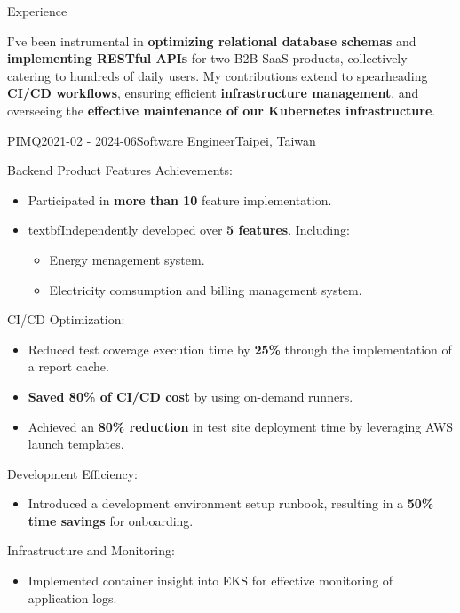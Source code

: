 \documentclass[
	11pt, %
]{resume} %
\newenvironment{myitemize}
  {\begin{itemize}
    \setlength{\itemsep}{-0.5em} \vspace{-0.5em}
  } %
  {\end{itemize}}
\begin{document}
\begin{rSection}{Experience}

  I’ve been instrumental in \textbf{optimizing relational database schemas} and \textbf{implementing RESTful APIs} for two B2B SaaS products, collectively catering to hundreds of daily users.
  My contributions extend to spearheading \textbf{CI/CD workflows}, ensuring efficient \textbf{infrastructure management}, and overseeing the \textbf{effective maintenance of our Kubernetes infrastructure}.

	\begin{rSubsection}{PIMQ}{2021-02 - 2024-06}{Software Engineer}{Taipei, Taiwan}
    \item Backend Product Features Achievements:
    \begin{myitemize}
      \item Participated in \textbf{more than 10} feature implementation. 
      \item textbf{Independently} developed over \textbf{5 features}. Including:
      \begin{myitemize}
        \item Energy menagement system.
        \item Electricity comsumption and billing management system.
      \end{myitemize}
    \end{myitemize}
    \item CI/CD Optimization:
    \begin{myitemize}
      \item Reduced test coverage execution time by \textbf{25\%} through the implementation of a report cache.
      \item \textbf{Saved 80\% of CI/CD cost} by using on-demand runners.
      \item Achieved an \textbf{80\% reduction} in test site deployment time by leveraging AWS launch templates.
    \end{myitemize}
    \item Development Efficiency:
    \begin{myitemize}
      \item Introduced a development environment setup runbook, resulting in a \textbf{50\% time savings} for onboarding.
    \end{myitemize}
    \item Infrastructure and Monitoring:
    \begin{myitemize}
      \item Implemented container insight into EKS for effective monitoring of application logs.

\end{myitemize}
\end{rSubsection}
\end{rSection}
\end{document}
